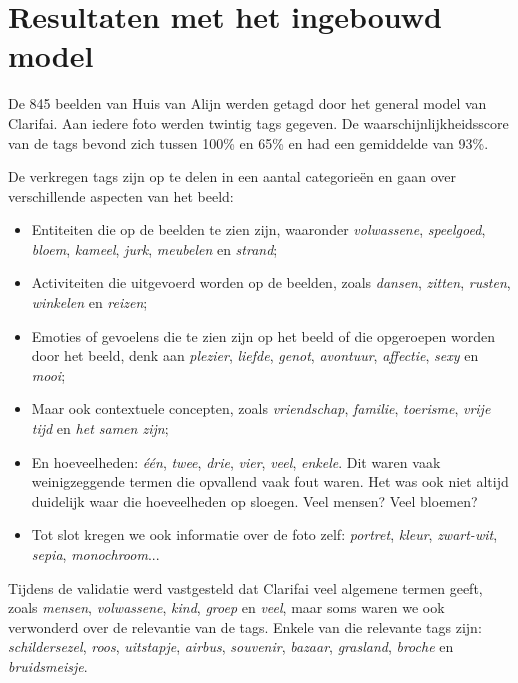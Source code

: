 \chapter{Resultaten met het ingebouwd model}
\label{ch:resultaten-ingebouwd-model}

De 845 beelden van Huis van Alijn werden getagd door het general model van Clarifai. Aan iedere foto werden twintig tags gegeven. De waarschijnlijkheidsscore van de tags bevond zich tussen 100\% en 65\% en had een gemiddelde van 93\%. 

De verkregen tags zijn op te delen in een aantal categorieën en gaan over verschillende aspecten van het beeld:
\begin{itemize}
	\item Entiteiten die op de beelden te zien zijn, waaronder \textit{volwassene}, \textit{speelgoed}, \textit{bloem}, \textit{kameel}, \textit{jurk}, \textit{meubelen} en \textit{strand};
	\item Activiteiten die uitgevoerd worden op de beelden, zoals \textit{dansen}, \textit{zitten}, \textit{rusten}, \textit{winkelen} en \textit{reizen};
	\item Emoties of gevoelens die te zien zijn op het beeld of die opgeroepen worden door het beeld, denk aan \textit{plezier}, \textit{liefde}, \textit{genot}, \textit{avontuur}, \textit{affectie}, \textit{sexy} en \textit{mooi};
	\item Maar ook contextuele concepten, zoals \textit{vriendschap}, \textit{familie}, \textit{toerisme}, \textit{vrije tijd} en \textit{het samen zijn};
	\item En hoeveelheden: \textit{één}, \textit{twee}, \textit{drie}, \textit{vier}, \textit{veel}, \textit{enkele}. Dit waren vaak weinigzeggende termen die opvallend vaak fout waren. Het was ook niet altijd duidelijk waar die hoeveelheden op sloegen. Veel mensen? Veel bloemen?
	\item Tot slot kregen we ook informatie over de foto zelf: \textit{portret}, \textit{kleur}, \textit{zwart-wit}, \textit{sepia}, \textit{monochroom}...
\end{itemize}

Tijdens de validatie werd vastgesteld dat Clarifai veel algemene termen geeft, zoals \textit{mensen}, \textit{volwassene}, \textit{kind}, \textit{groep} en \textit{veel}, maar soms waren we ook verwonderd over de relevantie van de tags. Enkele van die relevante tags zijn: \textit{schildersezel}, \textit{roos}, \textit{uitstapje}, \textit{airbus}, \textit{souvenir}, \textit{bazaar}, \textit{grasland}, \textit{broche} en \textit{bruidsmeisje}. 

